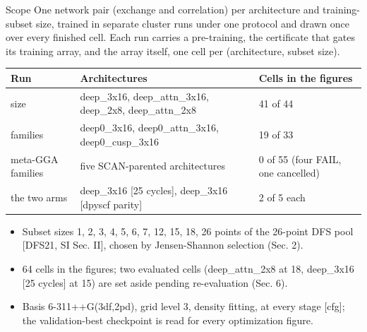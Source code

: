 \begin{frame}[label=f4]{Scope}
  \small
  One network pair (exchange and correlation) per architecture and training-subset size, trained in separate cluster runs under one protocol and drawn once over every finished cell. Each run carries a pre-training, the certificate that gates its training array, and the array itself, one cell per (architecture, subset size).
  \begin{center}\footnotesize\setlength{\tabcolsep}{4pt}
  \begin{tabular}{p{2.3cm}p{6.2cm}p{4.6cm}}
  \toprule
  Run & Architectures & Cells in the figures \\ \midrule
  size & deep\_3x16, deep\_attn\_3x16, deep\_2x8, deep\_attn\_2x8 & 41 of 44 \\
  families & deep0\_3x16, deep0\_attn\_3x16, deep0\_cusp\_3x16 & 19 of 33 \\
  meta-GGA families & five SCAN-parented architectures & 0 of 55 (four FAIL, one cancelled) \\
  the two arms & deep\_3x16 [25 cycles], deep\_3x16 [dpyscf parity] & 2 of 5 each \\
  \bottomrule
  \end{tabular}
  \end{center}
  \footnotesize
  \begin{itemize}
    \item Subset sizes 1, 2, 3, 4, 5, 6, 7, 12, 15, 18, 26 points of the 26-point DFS pool [DFS21, SI Sec. II], chosen by Jensen-Shannon selection (Sec. 2).
    \item 64 cells in the figures; two evaluated cells (deep\_attn\_2x8 at 18, deep\_3x16 [25 cycles] at 15) are set aside pending re-evaluation (Sec. 6).
    \item Basis 6-311++G(3df,2pd), grid level 3, density fitting, at every stage [cfg]; the validation-best checkpoint is read for every optimization figure.
  \end{itemize}
  \hfill \hyperlink{b1}{}
\end{frame}

